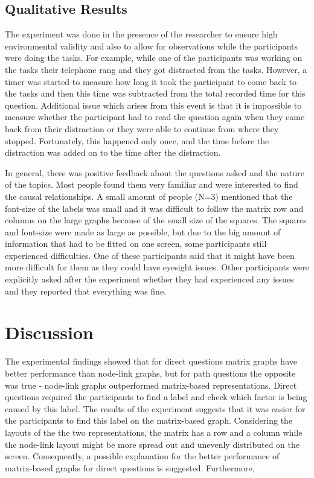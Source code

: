 \documentclass{l4proj}
\begin{document}
\section{Qualitative Results}

The experiment was done in the presence of the researcher to ensure high environmental validity and also to allow for  observations while the participants were doing the tasks. For example, while one of the participants was working on the tasks their telephone rang and they got distracted from the tasks. However, a timer was started to measure how long it took the participant to come back to the tasks and then this time was subtracted from the total recorded time for this question. Additional issue which arises from this event is that it is impossible to measure whether the participant had to read the question again when they came back from their distraction or they were able to continue from where they stopped. Fortunately, this happened only once, and the time before the distraction was added on to the time after the distraction.

In general, there was positive feedback about the questions asked and the nature of the topics. Most people found them very familiar and were interested to find the causal relationships. A small amount of people (N=3) mentioned that the font-size of the labels was small and it was difficult to follow the matrix row and columns on the large graphs because of the small size of the squares. The squares and font-size were made as large as possible, but due to the big amount of information that had to be fitted on one screen, some participants still experienced difficulties. One of these participants said that it might have been more difficult for them as they could have eyesight issues. Other participants were explicitly asked after the experiment whether they had experienced any issues and they reported that everything was fine.

\chapter{Discussion}

The experimental findings showed that for direct questions matrix graphs have better performance than node-link graphs, but for path questions the opposite was true - node-link graphs outperformed matrix-based representations. Direct questions required the participants to find a label and check which factor is being caused by this label. The results of the experiment suggests that it was easier for the participants to find this label on the matrix-based graph. Considering the layouts of the the two representations, the matrix has a row and a column while the node-link layout might be more spread out and unevenly distributed on the screen. Consequently, a possible explanation for the better performance of matrix-based graphs for direct questions is suggested. Furthermore,
\end{document}
